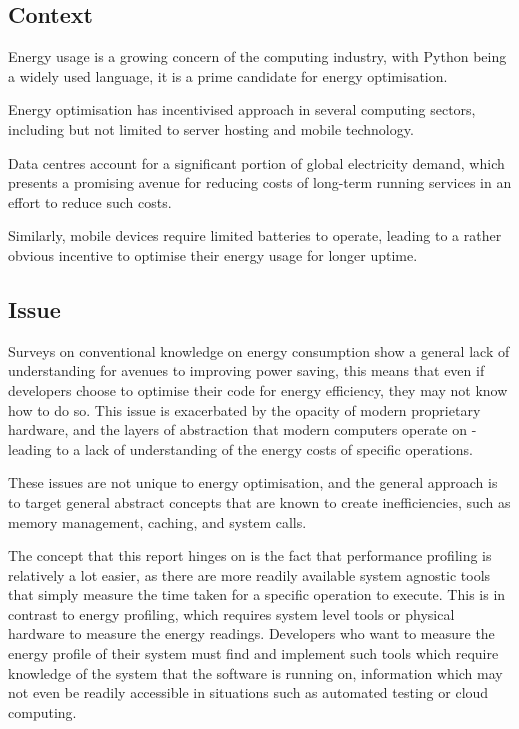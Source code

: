 \subsection{Context}\label{subsec:context}
Energy usage is a growing concern of the computing industry\cite{FrontierEnergyUsage,HistoricalComputingEnergyTrends},
with Python being a widely used language\cite{TIOBE}, it is a prime candidate for energy optimisation.

Energy optimisation has incentivised approach in several computing sectors, including but not limited to server hosting
and mobile technology.

Data centres account for a significant portion of global electricity demand\cite{IEADataCentres}, which presents a
promising avenue for reducing costs of long-term running services in an effort to reduce such
costs\cite{KIOCostsOfDataCentre, AssetSpireDataCosts}.

Similarly, mobile devices require limited batteries to operate, leading to a rather obvious incentive to optimise their
energy usage for longer uptime\cite{SmartPhoneFeatures}.

\subsection{Issue}\label{subsec:issue}
Surveys on conventional knowledge on energy consumption show a general lack of understanding for avenues to improving
power saving\cite{EnergyConsumptionKnowledge}, this means that even if developers choose to optimise their code for
energy efficiency, they may not know how to do so.
This issue is exacerbated by the opacity of modern proprietary hardware, and the layers of abstraction that modern
computers operate on - leading to a lack of understanding of the energy costs of specific operations.

These issues are not unique to energy optimisation, and the general approach is to target general abstract concepts
that are known to create inefficiencies, such as memory management, caching, and system calls.

The concept that this report hinges on is the fact that performance profiling is relatively a lot easier, as there
are more readily available system agnostic tools that simply measure the time taken for a specific operation to
execute.
This is in contrast to energy profiling, which requires system level tools or physical hardware to measure the energy
readings.
Developers who want to measure the energy profile of their system must find and implement such tools which require
knowledge of the system that the software is running on, information which may not even be readily accessible in
situations such as automated testing or cloud computing.


